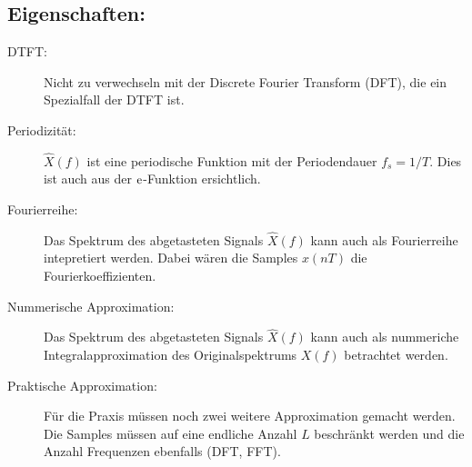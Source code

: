 	\subsection{Eigenschaften:}
	\begin{description}
	 \item [DTFT:] Nicht zu verwechseln mit der Discrete Fourier Transform (DFT), die ein Spezialfall der DTFT ist.
	 \item[Periodizität:] $\hat X(f)$ ist eine periodische Funktion mit der Periodendauer $f_s = 1/T$. Dies ist auch aus der $\mathrm{e}$-Funktion ersichtlich.
	 \item[Fourierreihe:] Das Spektrum des abgetasteten Signals $\hat X(f)$ kann auch als Fourierreihe intepretiert werden. Dabei wären die Samples $x(nT)$ die Fourierkoeffizienten.\\[0.2cm]
	 \item[Nummerische Approximation:] Das Spektrum des abgetasteten Signals $\hat X(f)$ kann auch als nummeriche Integralapproximation des Originalspektrums $X(f)$ betrachtet werden.\\[0.2cm]
	 \item[Praktische Approximation:] Für die Praxis müssen noch zwei weitere Approximation gemacht werden. Die Samples müssen auf eine endliche Anzahl $L$ beschränkt werden und die Anzahl Frequenzen ebenfalls (DFT, FFT).\\[0.2cm]
	\end{description}


